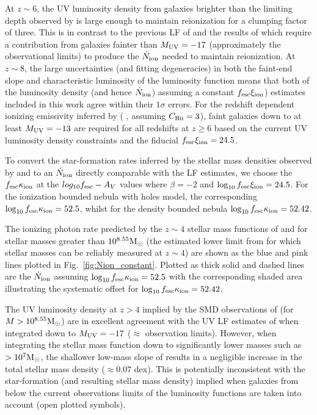 At $z\sim6$, the UV luminosity density from galaxies brighter than the limiting depth observed by \citet{Bouwens:2014tx} is large enough to maintain reionization for a clumping factor of three. This is in contrast to the previous LF of \citet{Anonymous:96uKWdy6} and the results of \citet{Finkelstein:2014ub} which require a contribution from galaxies fainter than $M_{\rm{UV}} = -17$ (approximately the observational limits) to produce the $\dot{N}_{\rm{ion}}$ needed to maintain reionization. At $z\sim8$, the large uncertainties (and fitting degeneracies) in both the faint-end slope and characteristic luminosity of the luminosity function means that both of the luminosity density (and hence $\dot{N}_{\rm{ion}}$) assuming a constant $f_{\rm{esc}}\xi_{\rm{ion}}$) estimates included in this work agree within their $1\sigma$ errors. For the redshift dependent ionizing emissivity inferred by \citeauthor{Bouwens:2015tm} (\citeyear{Bouwens:2015tm} , assuming $C_{\textsc{Hii}} = 3$), faint galaxies down to at least $M_{\rm{UV}} = -13$ are required for all redshifts at $z \geq 6$ based on the current UV luminosity density constraints and the fiducial $f_{\rm{esc}}\xi_{\rm{ion}} = 24.5$.

To convert the star-formation rates inferred by the stellar mass densities observed by \citet{Duncan:2014gh} and \citet{Grazian:2014vx} to an $\dot{N}_{\rm{ion}}$ directly comparable with the LF estimates, we choose the $f_{\rm{esc}}\kappa_{\rm{ion}}$ at the $log_{10}f_{\rm{esc}}-A_{V}$ values where $\beta = -2$ and $\log_{10} f_{\rm{esc}}\xi_{\rm{ion}} = 24.5$. For the ionization bounded nebula with holes model, the corresponding $\log_{10} f_{\rm{esc}}\kappa_{\rm{ion}} =  52.5$, whilst for the density bounded nebula $\log_{10} f_{\rm{esc}}\kappa_{\rm{ion}} = 52.42$.

The ionizing photon rate predicted by the $z\sim4$ stellar mass functions of \citet{Duncan:2014gh} and \citet{Grazian:2014vx} for stellar masses greater than $10^{8.55}\/\rm{M}_{\odot}$ (the estimated lower limit from \citep{Duncan:2014gh} for which stellar masses can be reliably measured at $z\sim4$) are shown as the blue and pink lines plotted in Fig.~\ref{fig:Nion_constant}. Plotted as thick solid and dashed lines are the $\dot{N}_{\rm{ion}}$ assuming $\log_{10} f_{\rm{esc}}\kappa_{\rm{ion}} = 52.5$ with the corresponding shaded area illustrating the systematic offset for $\log_{10} f_{\rm{esc}}\kappa_{\rm{ion}} = 52.42$. 

The UV luminosity density at $z > 4$ implied by the SMD observations of \citet{Grazian:2014vx} (for $M>10^{8.55}\/\rm{M}_{\odot}$) are in excellent agreement with the UV LF estimates of \citet{Bouwens:2014tx} when integrated down to $M_{\rm{UV}} = -17$ ($\approx$ observation limits). However, when integrating the stellar mass function down to significantly lower masses such as $> 10^{7} \rm{M}_{\odot}$, the shallower low-mass slope of \citep{Grazian:2014vx} results in a negligible increase in the total stellar mass density ($\approx 0.07$ dex). This is potentially inconsistent with the star-formation (and resulting stellar mass density) implied when galaxies from below the current observations limits of the luminosity functions are taken into account (open plotted symbols). 

